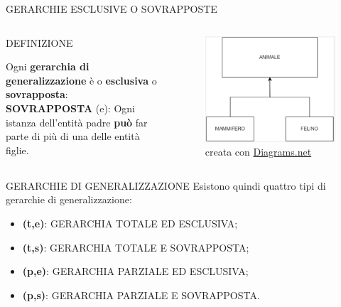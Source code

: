\documentclass[aspectratio=1610]{beamer}
\begin{document}
\begin{frame}{GERARCHIE ESCLUSIVE O SOVRAPPOSTE}
    \begin{columns}
            \begin{alertblock}{DEFINIZIONE}
                \begin{minipage}{0.96\linewidth}
                    \justifying
                    Ogni \textbf{gerarchia di generalizzazione} è o \textbf{esclusiva} o \textbf{sovrapposta}:\\
                    \bigskip
                    \textbf{SOVRAPPOSTA} (e): Ogni istanza dell'entità padre \textbf{può} far parte di più di una delle entità figlie.\\
                    \bigskip
                \end{minipage}
            \end{alertblock}
            \begin{figure}
        \includegraphics[width=.8\linewidth]{img/sovrapposta.png}
        \caption{{creata con \href{https://app.diagrams.net/}{Diagrams.net}}}
            \end{figure}
    \end{columns}
\end{frame}

\begin{frame}{GERARCHIE DI GENERALIZZAZIONE}
    Esistono quindi quattro tipi di gerarchie di generalizzazione:
    \pause
    \begin{itemize}
        \item \textbf{(t,e)}: GERARCHIA TOTALE ED ESCLUSIVA;
        \pause
        \item \textbf{(t,s)}: GERARCHIA TOTALE E SOVRAPPOSTA;
        \pause
        \item \textbf{(p,e)}: GERARCHIA PARZIALE ED ESCLUSIVA;
        \pause
        \item \textbf{(p,s)}: GERARCHIA PARZIALE E SOVRAPPOSTA.
    \end{itemize}
\end{frame}
\end{document}
